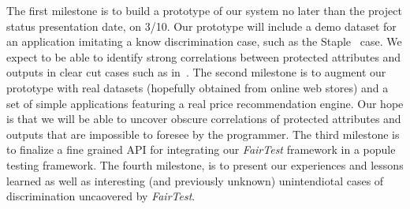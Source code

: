 \documentclass{article}
\newcommand{\thetool}{{\it FairTest}\xspace}
\newcommand{\heading}[1]{\noindent{\bf{#1}}}
\begin{document}
\heading{Research Plan.}
The first milestone is to build a prototype of our system no later than
the project status presentation date, on 3/10. Our prototype will include a
demo dataset for an application imitating a know discrimination case, such as
the Staple~\cite{Staples} case. We expect to be able to identify strong
correlations between protected attributes and outputs in clear cut cases such
as in~\cite{Staples}. The second milestone is to augment our prototype
with real datasets (hopefully obtained from online web stores) and a set of
simple applications featuring a real price recommendation engine. Our hope is
that we will be able to uncover obscure correlations of protected attributes
and outputs that are impossible to foresee by the programmer. The third
milestone is to finalize a fine grained API for integrating our \thetool
framework in a popule testing framework. The fourth milestone, is to present
our experiences and lessons learned as well as interesting (and previously
unknown) unintendiotal cases of discrimination uncaovered by \thetool.

\clearpage
{
  \scriptsize
  \setlength\itemsep{0pt}
  \footnotesize
  
  
}
\end{document}
